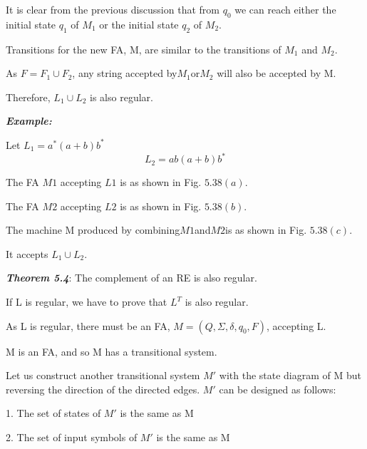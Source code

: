 \documentclass[10pt,a4paper]{article}
\begin{document}
It is clear from the previous discussion that from $q_{0}$ we can reach either the initial state $q_{1}$ of $M_{1}$ or the initial state $q_{2}$ of $M_{2}$.

Transitions for the new FA, M, are similar to the transitions of $M_{1}$ and $M_{2}$.

As $F = F_{1} \cup F_{2}$, any string accepted by$M_{1}$or$M_{2}$ will also be accepted by M.

Therefore, $L_{1} \cup L_{2}$ is also regular.

\emph{\textbf{Example:}}

Let\qquad\qquad\qquad\qquad\qquad\; $L_{1} = a^{*}(a + b)b^{*}$
$$L_{2} = ab(a + b)b^{*}$$

The FA $M1$ accepting $L1$ is as shown in Fig. $5.38(a)$.

The FA $M2$ accepting $L2$ is as shown in Fig. $5.38(b)$.

The machine M produced by combining$M1$and$M2$is as shown in Fig. $5.38(c)$.

It accepts $L_{1} \cup L_{2}$.

\emph{\textbf{Theorem 5.4}}: The complement of an RE is also regular.

If L is regular, we have to prove that $L^{T}$ is also regular.

\qquad As L is regular, there must be an FA, $M = (Q, \Sigma, \delta, q_{0}, F)$, accepting L.

M is an FA, and so M has a transitional system.

\quad Let us construct another transitional system $M\prime$ with the state diagram of M but reversing the direction of the directed edges. $M\prime$ can be designed as follows:

1. The set of states of $M\prime$ is the same as M

2. The set of input symbols of $M\prime$ is the same as M
\end{document}
